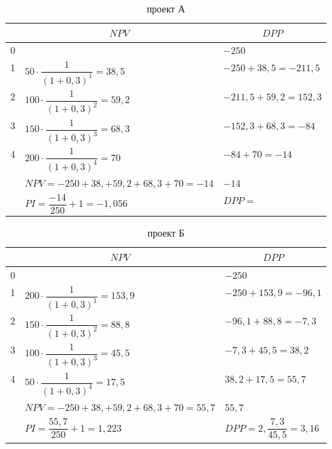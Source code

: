 
\begin{table}[]
	\caption{проект А}
	\small
	\setlength{\extrarowheight}{2.7mm}
		\begin{tabularx}{\textwidth}{|K{1.55cm}|p{5cm}|p{5cm}|}
		\hline
		&                       &  \\  &                                                                    &  $    -250   $                 \\  & $50 \cdot \dfrac{1}{(1+0,3)^1} = 38,5$  &$ -250 +38,5   = -211,5     $            \\  & $100 \cdot \dfrac{1}{(1+0,3)^2} = 59,2$ & $-211,5  +59,2=152,3      $           \\  & $150 \cdot \dfrac{1}{(1+0,3)^3} = 68,3$ &$-152,3  +68,3=-84    $             \\  & $200 \cdot \dfrac{1}{(1+0,3)^4} = 70$  & $-84 +70= -14     $                \\ \hline
		&$NPV = -250+38,+59,2+68,3+70=-14$     & $-14 $                     \\ \hline
		&$PI = \dfrac{-14}{250}+1=-1,056$                                        & $DPP = $                 \\ \hline
		\end{tabularx}
		\end{table}

\begin{table}[!h]
	\caption{проект Б}
	\small
	\setlength{\extrarowheight}{2.7mm}
	\begin{tabularx}{\textwidth}{|K{1.55cm}|p{5cm}|p{5cm}|}
		\hline
		&                       &  \\  &                                                                    &  $    -250   $                 \\  & $200 \cdot \dfrac{1}{(1+0,3)^1} = 153,9$  &$ -250 +153,9   = -96,1     $            \\  & $150 \cdot \dfrac{1}{(1+0,3)^2} = 88,8$ & $-96,1  +88,8=-7,3      $           \\  & $100 \cdot \dfrac{1}{(1+0,3)^3} = 45,5$ &$-7,3  +45,5=38,2    $             \\  & $50 \cdot \dfrac{1}{(1+0,3)^4} =17,5$  & $38,2 +17,5= 55,7     $                \\ \hline
		&$NPV = -250+38,+59,2+68,3+70=55,7$     & $55,7 $                     \\ \hline
		&$PI = \dfrac{55,7}{250}+1=1,223$                                        & $DPP = 2,\dfrac{7,3}{45,5}=3,16$                 \\ \hline
	\end{tabularx}
\end{table}

